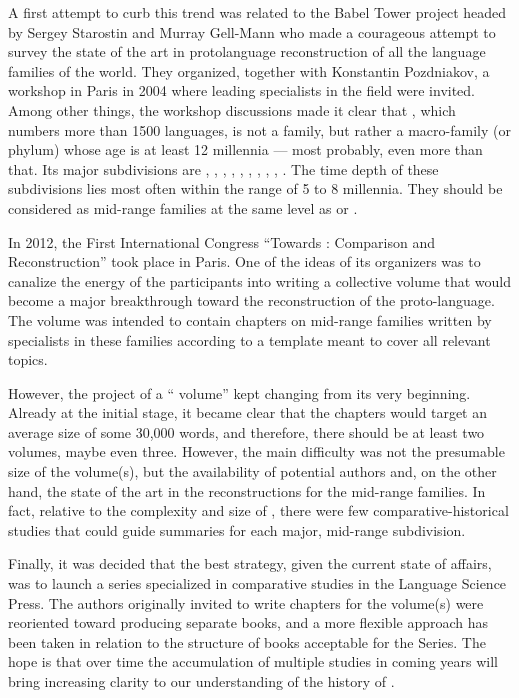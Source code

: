 A first attempt to curb this trend was related to the Babel Tower project headed by Sergey Starostin and Murray Gell-Mann who made a courageous attempt to survey the state of the art in protolanguage reconstruction of all the language families of the world. They organized, together with Konstantin Pozdniakov, a  workshop in Paris in 2004 where leading specialists in the field were invited. Among other things, the workshop discussions made it clear that , which numbers more than 1500 languages, is not a family, but rather a macro-family (or phylum) whose age is at least 12 millennia — most probably, even more than that. Its major subdivisions are , , , , , , , , , .  The time depth of these subdivisions lies most often within the range of 5 to 8 millennia.  They should be considered as mid-range families at  the same level as  or .

In 2012, the First International Congress ``Towards : Comparison and Reconstruction'' took place in Paris. One of the ideas of its organizers was to canalize the energy of the participants into writing a collective volume that would become a major breakthrough toward the reconstruction of the proto-language. The volume was intended to contain chapters on mid-range families written by specialists in these families according to a template meant to cover all relevant topics.

However, the project of a `` volume'' kept changing  from its very beginning. Already at the initial stage, it became  clear that the chapters would target an average size of some 30,000 words, and therefore, there should be at least two volumes, maybe even three. However, the main difficulty was not the presumable size of the volume(s), but the availability of potential authors and, on the other hand, the state of the art in the reconstructions for the mid-range families. In fact, relative to the complexity and size of , there were few comparative-historical studies that could guide summaries for each major, mid-range subdivision.  

Finally, it was decided that the best strategy, given the current state of affairs, was to launch a series specialized in  comparative studies in the Language Science Press. The authors originally invited to write chapters for the  volume(s) were reoriented toward producing separate books, and a more flexible approach has been taken in relation to the structure of books acceptable for the Series. The hope is that over time the accumulation of multiple studies in coming years will bring increasing clarity to our understanding of the history of .

